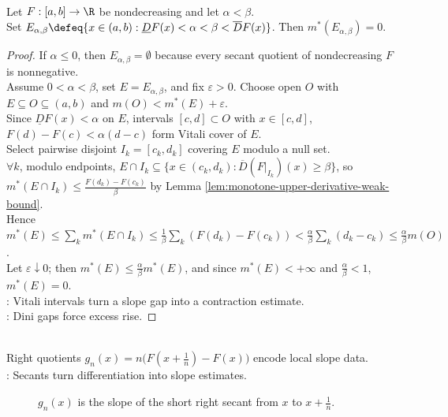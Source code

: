 \begin{lemma} \label{lem:dini-gap-sets-null-monotone} \\
Let $F:[a,b]\to\R$ be nondecreasing and let $\alpha<\beta$.\\
Set $E_{\alpha,\beta}\defeq\{x\in(a,b):\underline{D}F(x)<\alpha<\beta<\overline{D}F(x)\}$. Then $m^\ast(E_{\alpha,\beta})=0$.
\begin{proof} If $\alpha\leq0$, then $E_{\alpha,\beta}=\emptyset$ because every secant quotient of nondecreasing $F$ is nonnegative.\\
Assume $0<\alpha<\beta$, set $E=E_{\alpha,\beta}$, and fix $\varepsilon>0$. Choose open $O$ with $E\subseteq O\subseteq(a,b)$ and $m(O)<m^\ast(E)+\varepsilon$.\\
Since $\underline{D}F(x)<\alpha$ on $E$, intervals $[c,d]\subset O$ with $x\in[c,d]$, $F(d)-F(c)<\alpha(d-c)$ form Vitali cover of $E$.\\
Select pairwise disjoint $I_k=[c_k,d_k]$ covering $E$ modulo a null set.\\
$\forall k$, modulo endpoints, $E\cap I_k\subseteq\{x\in(c_k,d_k):\overline{D}(F|_{I_k})(x)\geq\beta\}$, so $m^\ast(E\cap I_k)\leq\frac{F(d_k)-F(c_k)}{\beta}$ by Lemma \ref{lem:monotone-upper-derivative-weak-bound}.\\
Hence $m^\ast(E)\leq\sum\limits_km^\ast(E\cap I_k)\leq\frac{1}{\beta}\sum\limits_k(F(d_k)-F(c_k))<\frac{\alpha}{\beta}\sum\limits_k(d_k-c_k)\leq\frac{\alpha}{\beta}m(O)$.\\
Let $\varepsilon\downarrow0$; then $m^\ast(E)\leq\frac{\alpha}{\beta}m^\ast(E)$, and since $m^\ast(E)<+\infty$ and $\frac{\alpha}{\beta}<1$, $m^\ast(E)=0$.\\
: Vitali intervals turn a slope gap into a contraction estimate.\\
: Dini gaps force excess rise.
\end{proof}
\end{lemma}

\begin{perspective} \label{per:lebesgue-right-secants} \\
Right quotients $g_n(x)=n\bigl(F(x+\frac{1}{n})-F(x)\bigr)$ encode local slope data.\\
: Secants turn differentiation into slope estimates.
\end{perspective}

\begin{figure}[H]
  \centering
  
  \caption{$g_n(x)$ is the slope of the short right secant from $x$ to $x+\frac{1}{n}$.}
  \label{fig:lebesgue-right-secants}
\end{figure}

